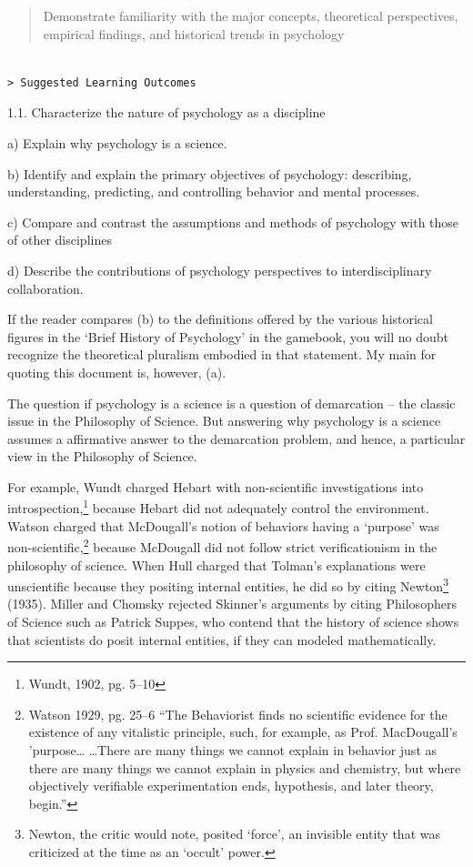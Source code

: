 \begin{quote}

Demonstrate familiarity with the major concepts, theoretical perspectives, empirical findings, and historical trends in psychology
\end{quote}

\begin{adjustwidth}{2.5em}{2.5em}
\begin{verbatim}

> Suggested Learning Outcomes

\end{verbatim}
\end{adjustwidth}

1.1. Characterize the nature of psychology as a discipline

a) Explain why psychology is a science.

b) Identify and explain the primary objectives of psychology: describing, understanding, predicting, and controlling behavior and mental processes.

c) Compare and contrast the assumptions and methods of psychology with those of other disciplines

d) Describe the contributions of psychology perspectives to interdisciplinary collaboration.

If the reader compares (b) to the definitions offered by the various historical figures in the `Brief History of Psychology' in the gamebook, you will no doubt recognize the theoretical pluralism embodied in that statement. My main for quoting this document is, however, (a).

The question if psychology is a science is a question of demarcation – the classic issue in the Philosophy of Science. But answering why psychology is a science assumes a affirmative answer to the demarcation problem, and hence, a particular view in the Philosophy of Science. 

For example, Wundt charged Hebart with non-scientific investigations into introspection,\footnote{Wundt, 1902, pg. 5--10} because Hebart did not adequately control the environment. Watson charged that McDougall's notion of behaviors having a `purpose' was non-scientific,\footnote{Watson 1929, pg. 25--6 ``The Behaviorist finds no scientific evidence for the existence of any vitalistic principle, such, for example, as Prof. MacDougall's 'purpose{\ldots} {\ldots}There are many things we cannot explain in behavior just as there are many things we cannot explain in physics and chemistry, but where objectively verifiable experimentation ends, hypothesis, and later theory, begin.''} because McDougall did not follow strict verificationism in the philosophy of science. When Hull charged that Tolman's explanations were unscientific because they positing internal entities, he did so by citing Newton\footnote{Newton, the critic would note, posited `force', an invisible entity that was criticized at the time as an `occult' power.} (1935). Miller and Chomsky rejected Skinner's arguments by citing Philosophers of Science such as Patrick Suppes, who contend that the history of science shows that scientists do posit internal entities, if they can modeled mathematically.


